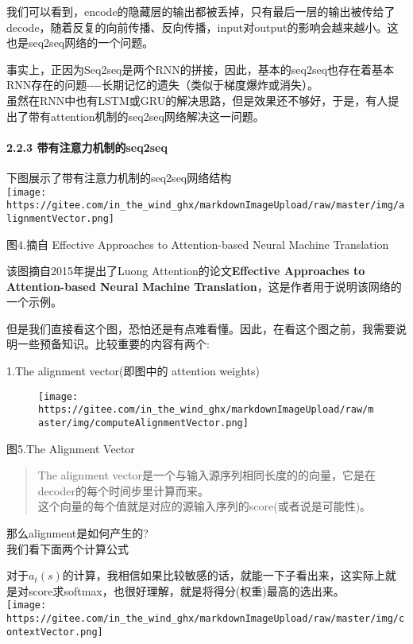\documentclass[
]{article}
\begin{document}
我们可以看到，encode的隐藏层的输出都被丢掉，只有最后一层的输出被传给了decode，随着反复的向前传播、反向传播，input对output的影响会越来越小。这也是seq2seq网络的一个问题。

事实上，正因为Seq2seq是两个RNN的拼接，因此，基本的seq2seq也存在着基本RNN存在的问题-\/-\/-\/-长期记忆的遗失（类似于梯度爆炸或消失）。\\
虽然在RNN中也有LSTM或GRU的解决思路，但是效果还不够好，于是，有人提出了带有attention机制的seq2seq网络解决这一问题。

\hypertarget{header-n39}{%
\paragraph{2.2.3 带有注意力机制的seq2seq}\label{header-n39}}

下图展示了带有注意力机制的seq2seq网络结构\\
\texttt{[image: https://gitee.com/in\_the\_wind\_ghx/markdownImageUpload/raw/master/img/alignmentVector.png]}

图4.摘自 Effective Approaches to Attention-based Neural Machine Translation

该图摘自2015年提出了Luong Attention的论文\textbf{Effective Approaches to
Attention-based Neural Machine
Translation}，这是作者用于说明该网络的一个示例。

但是我们直接看这个图，恐怕还是有点难看懂。因此，在看这个图之前，我需要说明一些预备知识。比较重要的内容有两个:

1.The alignment vector(即图中的 attention weights)

\begin{figure}
\centering
\texttt{[image: https://gitee.com/in\_the\_wind\_ghx/markdownImageUpload/raw/master/img/computeAlignmentVector.png]}
\caption{}
\end{figure}

图5.The Alignment Vector

\begin{quote}
The alignment
vector是一个与输入源序列相同长度的的向量，它是在decoder的每个时间步里计算而来。\\
这个向量的每个值就是对应的源输入序列的score(或者说是可能性)。
\end{quote}

那么alignment是如何产生的?\\
我们看下面两个计算公式

对于\(a_t(s)\)的计算，我相信如果比较敏感的话，就能一下子看出来，这实际上就是对score求softmax，也很好理解，就是将得分(权重)最高的选出来。\\
\texttt{[image: https://gitee.com/in\_the\_wind\_ghx/markdownImageUpload/raw/master/img/contextVector.png]}
\end{document}
